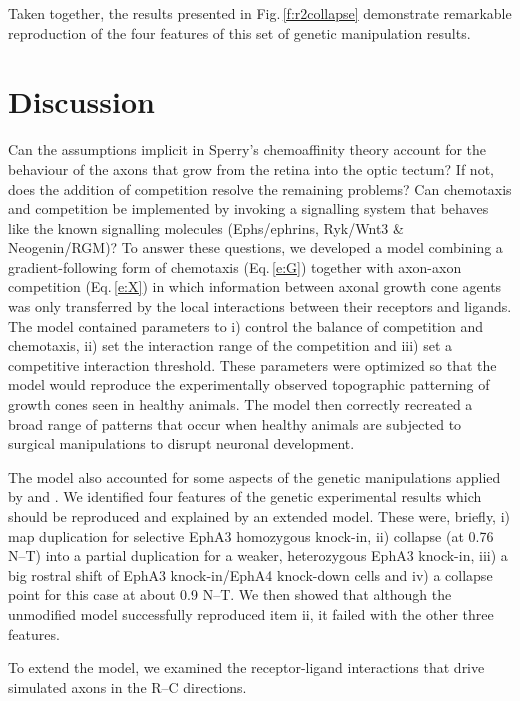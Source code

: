 \documentclass[11pt, a4paper]{article}
\begin{document}
Taken together, the results presented in Fig.\,\ref{f:r2collapse} demonstrate remarkable reproduction of the four features of this set of genetic manipulation results.

\section{Discussion}


Can the assumptions implicit in Sperry's chemoaffinity theory account for the behaviour of the axons that grow from the retina into the optic tectum?
If not, does the addition of competition resolve the remaining problems? 
Can chemotaxis and competition be implemented by invoking a signalling system that behaves like the known signalling molecules (Ephs/ephrins, Ryk/Wnt3 \& Neogenin/RGM)?
To answer these questions, we developed a model combining a gradient-following form of chemotaxis (Eq.\,\ref{e:G}) together with axon-axon competition (Eq.\,\ref{e:X}) in which information between axonal growth cone agents was only transferred by the local interactions between their receptors and ligands.
The model contained parameters to i) control the balance of competition and chemotaxis, ii) set the interaction range of the competition and iii) set a competitive interaction threshold. 
These parameters were optimized so that the model would reproduce the experimentally observed topographic patterning of growth cones seen in healthy animals. 
The model then correctly recreated a broad range of patterns that occur when healthy animals are subjected to surgical manipulations to disrupt neuronal development.

The model also accounted for some aspects of the genetic manipulations applied by \citet{brown_topographic_2000} and \citet{reber_relative_2004}.
We identified four features of the genetic experimental results which should be reproduced and explained by an extended model. 
These were, briefly, i) map duplication for selective EphA3 homozygous knock-in, ii) collapse (at 0.76 N--T) into a partial duplication for a weaker, heterozygous EphA3 knock-in, iii) a big rostral shift of EphA3 knock-in/EphA4 knock-down cells and iv) a collapse point for this case at about 0.9 N--T.
We then showed that although the unmodified model successfully reproduced item ii, it failed with the other three features.

To extend the model, we examined the receptor-ligand interactions that drive simulated axons in the R--C directions. 
\end{document}
